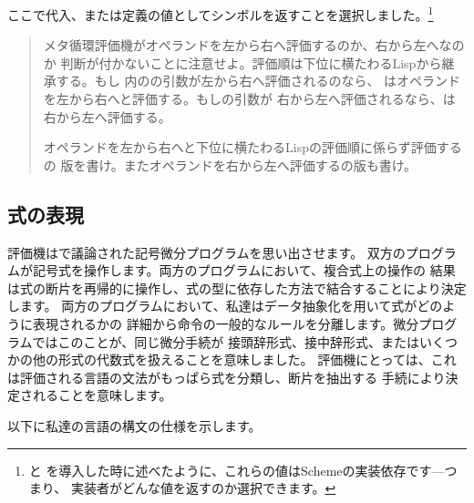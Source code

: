 \noindent
ここで代入、または定義の値としてシンボルを返すことを選択しました。\footnote{と
を導入した時に述べたように、これらの値はSchemeの実装依存です---つまり、
実装者がどんな値を返すのか選択できます。}

\begin{quote}
メタ循環評価機がオペランドを左から右へ評価するのか、右から左へなのか
判断が付かないことに注意せよ。評価順は下位に横たわるLispから継承する。もし
内のの引数が左から右へ評価されるのなら、
はオペランドを左から右へと評価する。もしの引数が
右から左へ評価されるなら、は右から左へ評価する。



オペランドを左から右へと下位に横たわるLispの評価順に係らず評価するの
版を書け。またオペランドを右から左へ評価するの版も書け。
\end{quote}

\subsection{式の表現}
\label{Sec. 4.1.2}
\label{Section 4.1.2}



評価機はで議論された記号微分プログラムを思い出させます。
双方のプログラムが記号式を操作します。両方のプログラムにおいて、複合式上の操作の
結果は式の断片を再帰的に操作し、式の型に依存した方法で結合することにより決定します。
両方のプログラムにおいて、私達はデータ抽象化を用いて式がどのように表現されるかの
詳細から命令の一般的なルールを分離します。微分プログラムではこのことが、同じ微分手続が
接頭辞形式、接中辞形式、またはいくつかの他の形式の代数式を扱えることを意味しました。
評価機にとっては、これは評価される言語の文法がもっぱら式を分類し、断片を抽出する
手続により決定されることを意味します。


以下に私達の言語の構文の仕様を示します。

